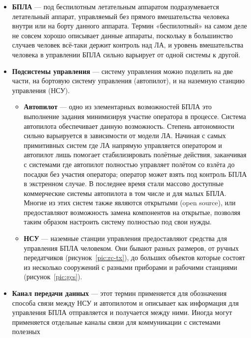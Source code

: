 \documentclass[specification,annotation]{itmo-student-thesis}
\begin{document}
\begin{itemize}
  \item \textbf{БПЛА} --- под беспилотным летательным аппаратом подразумевается
    летательный аппарат, управляемый без прямого вмешательства человека внутри
    или на борту данного аппарата. Термин «беспилотный» на самом деле не совсем
    хорошо описывает данные аппараты, поскольку в большинство случаев человек
    всё-таки держит контроль над ЛА, и уровень вмешательства человека в
    управлении БПЛА сильно варьирует от одной системы к другой.
  \item \textbf{Подсистемы управления} --- систему управления можно поделить на
    две части, на бортовую систему управления (автопилот), и на наземную
    станцию управления (НСУ).
    \begin{itemize}
      \item \textbf{Автопилот} --- одно из элементарных возможностей БПЛА это
        выполнение задания минимизируя участие оператора в процессе. Система
        автопилота обеспечивает данную возможность. Степень автономности сильно
        варьируется в зависимости от модели ЛА. Начиная с самых примитивных
        систем где ЛА напрямую управляется оператором и автопилот лишь помогает
        стабилизировать полётные действия, заканчивая с системами где автопилот
        полностью управляет полётом со взлёта до посадки без участия оператора;
        оператор может взять под контроль БПЛА в экстренном случае. В последнее
        время стали массово доступные коммерческие системы автопилота в том
        числе и для малых БПЛА. Многие из этих систем также являются открытыми
        (open source), или предоставляют возможность замена компонентов на
        открытые, позволяя таким образом настроить систему полностью под свои
        нужды.
      \item \textbf{НСУ} --- наземные станции управления предоставляют средства
        для управления БПЛА человеком. Они бывают разных размеров, от ручных
        передатчиков (рисунок~\ref{pic:rc-tx}), до больших объектов которые состоят из
        несколько сооружений с разными приборами и рабочими станциями
        (рисунок~\ref{pic:gcs}).
    \end{itemize}
  \item \textbf{Канал передачи данных} --- этот термин применяется для
    обозначения способа связи между НСУ и автопилотом и описывает как информация
    для управления БПЛА отправляется и получается между ними. Иногда могут
    применяется отдельные каналы связи для коммуникации с системами полезных

\end{itemize}
\end{document}
